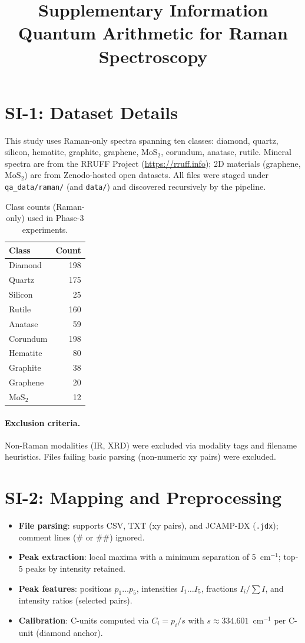\documentclass[12pt]{article}
\title{Supplementary Information\\Quantum Arithmetic for Raman Spectroscopy}
\date{}
\begin{document}
\maketitle

\section*{SI-1: Dataset Details}
This study uses Raman-only spectra spanning ten classes: diamond, quartz, silicon, hematite, graphite, graphene, MoS$_2$, corundum, anatase, rutile. Mineral spectra are from the RRUFF Project (\url{https://rruff.info}); 2D materials (graphene, MoS$_2$) are from Zenodo-hosted open datasets. All files were staged under \texttt{qa\_data/raman/} (and \texttt{data/}) and discovered recursively by the pipeline.

\begin{table}[H]
\centering
\caption{Class counts (Raman-only) used in Phase-3 experiments.}
\begin{tabular}{l r}
\toprule
Class & Count \\
\midrule
Diamond & 198 \\
Quartz & 175 \\
Silicon & 25 \\
Rutile & 160 \\
Anatase & 59 \\
Corundum & 198 \\
Hematite & 80 \\
Graphite & 38 \\
Graphene & 20 \\
MoS$_2$ & 12 \\
\bottomrule
\end{tabular}
\end{table}

\paragraph{Exclusion criteria.} Non-Raman modalities (IR, XRD) were excluded via modality tags and filename heuristics. Files failing basic parsing (non-numeric xy pairs) were excluded.

\section*{SI-2: Mapping and Preprocessing}
\begin{itemize}
  \item \textbf{File parsing}: supports CSV, TXT (xy pairs), and JCAMP-DX (\texttt{.jdx}); comment lines (\# or \#\#) ignored.
  \item \textbf{Peak extraction}: local maxima with a minimum separation of 5~cm$^{-1}$; top-5 peaks by intensity retained.
  \item \textbf{Peak features}: positions $p_1\ldots p_5$, intensities $I_1\ldots I_5$, fractions $I_i/\sum I$, and intensity ratios (selected pairs).
  \item \textbf{Calibration}: C-units computed via $C_i = p_i/s$ with $s\approx 334.601$~cm$^{-1}$ per C-unit (diamond anchor).
\end{itemize}
\end{document}
